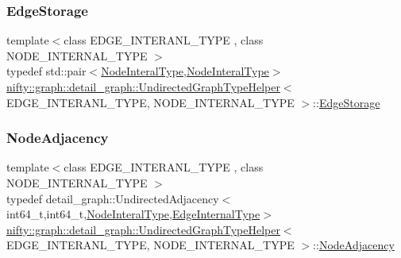 \subsubsection{\texorpdfstring{Edge\+Storage}{EdgeStorage}}
{\footnotesize\ttfamily template$<$class E\+D\+G\+E\+\_\+\+I\+N\+T\+E\+R\+A\+N\+L\+\_\+\+T\+Y\+PE , class N\+O\+D\+E\+\_\+\+I\+N\+T\+E\+R\+N\+A\+L\+\_\+\+T\+Y\+PE $>$ \\
typedef std\+::pair$<$\hyperlink{structnifty_1_1graph_1_1detail__graph_1_1UndirectedGraphTypeHelper_a4c2041ab030e3eb561a2955a3bbfb5d7}{Node\+Interal\+Type},\hyperlink{structnifty_1_1graph_1_1detail__graph_1_1UndirectedGraphTypeHelper_a4c2041ab030e3eb561a2955a3bbfb5d7}{Node\+Interal\+Type}$>$ \hyperlink{structnifty_1_1graph_1_1detail__graph_1_1UndirectedGraphTypeHelper}{nifty\+::graph\+::detail\+\_\+graph\+::\+Undirected\+Graph\+Type\+Helper}$<$ E\+D\+G\+E\+\_\+\+I\+N\+T\+E\+R\+A\+N\+L\+\_\+\+T\+Y\+PE, N\+O\+D\+E\+\_\+\+I\+N\+T\+E\+R\+N\+A\+L\+\_\+\+T\+Y\+PE $>$\+::\hyperlink{structnifty_1_1graph_1_1detail__graph_1_1UndirectedGraphTypeHelper_a43eb7f2cfb5036f87e9496bb6b8d064d}{Edge\+Storage}}

\mbox{\label{structnifty_1_1graph_1_1detail__graph_1_1UndirectedGraphTypeHelper_a626e3edd4cc8c7e33ec89e6a7454561a}} 
\subsubsection{\texorpdfstring{Node\+Adjacency}{NodeAdjacency}}
{\footnotesize\ttfamily template$<$class E\+D\+G\+E\+\_\+\+I\+N\+T\+E\+R\+A\+N\+L\+\_\+\+T\+Y\+PE , class N\+O\+D\+E\+\_\+\+I\+N\+T\+E\+R\+N\+A\+L\+\_\+\+T\+Y\+PE $>$ \\
typedef detail\+\_\+graph\+::\+Undirected\+Adjacency$<$int64\+\_\+t,int64\+\_\+t,\hyperlink{structnifty_1_1graph_1_1detail__graph_1_1UndirectedGraphTypeHelper_a4c2041ab030e3eb561a2955a3bbfb5d7}{Node\+Interal\+Type},\hyperlink{structnifty_1_1graph_1_1detail__graph_1_1UndirectedGraphTypeHelper_ac7309a31e7a003860ce1f1a882e6813e}{Edge\+Internal\+Type}$>$ \hyperlink{structnifty_1_1graph_1_1detail__graph_1_1UndirectedGraphTypeHelper}{nifty\+::graph\+::detail\+\_\+graph\+::\+Undirected\+Graph\+Type\+Helper}$<$ E\+D\+G\+E\+\_\+\+I\+N\+T\+E\+R\+A\+N\+L\+\_\+\+T\+Y\+PE, N\+O\+D\+E\+\_\+\+I\+N\+T\+E\+R\+N\+A\+L\+\_\+\+T\+Y\+PE $>$\+::\hyperlink{structnifty_1_1graph_1_1detail__graph_1_1UndirectedGraphTypeHelper_a626e3edd4cc8c7e33ec89e6a7454561a}{Node\+Adjacency}}

